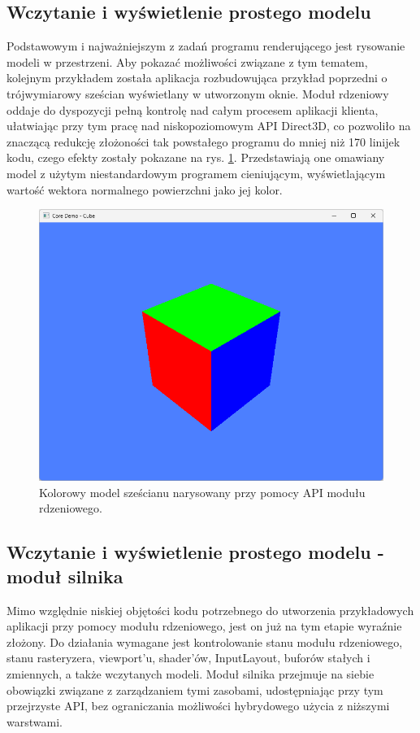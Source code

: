 \subsection{Wczytanie i wyświetlenie prostego modelu}
Podstawowym i najważniejszym z zadań programu renderującego jest rysowanie modeli w przestrzeni. Aby pokazać możliwości związane z tym tematem, kolejnym przykładem została aplikacja rozbudowująca przykład poprzedni o trójwymiarowy sześcian wyświetlany w utworzonym oknie. Moduł rdzeniowy oddaje do dyspozycji pełną kontrolę nad całym procesem aplikacji klienta, ułatwiając przy tym pracę nad niskopoziomowym API Direct3D, co pozwoliło na znaczącą redukcję złożoności tak powstałego programu do mniej niż 170 linijek kodu, czego efekty zostały pokazane na rys. \ref{demo_core_cube}. Przedstawiają one omawiany model z użytym niestandardowym programem cieniującym, wyświetlającym wartość wektora normalnego powierzchni jako jej kolor. 

\begin{figure}[h!]
	\centering
	\includegraphics[width=\textwidth]{images/demo_core_cube.png}
	\caption{Kolorowy model sześcianu narysowany przy pomocy API modułu rdzeniowego.}
	\label{demo_core_cube}
\end{figure}

\subsection{Wczytanie i wyświetlenie prostego modelu - moduł silnika}
\label{subsection_demo_engine_cube}
Mimo względnie niskiej objętości kodu potrzebnego do utworzenia przykładowych aplikacji przy pomocy modułu rdzeniowego, jest on już na tym etapie wyraźnie złożony. Do działania wymagane jest kontrolowanie stanu modułu rdzeniowego, stanu rasteryzera, viewport'u, shader'ów, InputLayout, buforów stałych i zmiennych, a także wczytanych modeli. Moduł silnika przejmuje na siebie obowiązki związane z zarządzaniem tymi zasobami, udostępniając przy tym przejrzyste API, bez ograniczania możliwości hybrydowego użycia z niższymi warstwami. 

